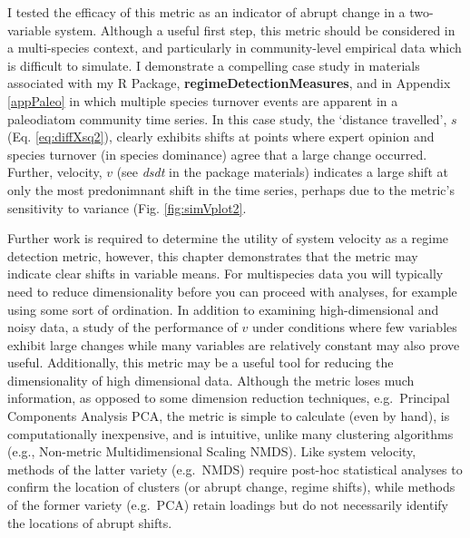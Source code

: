 \documentclass[12pt,twoside,openany]{reedthesis}
\begin{document}
I tested the efficacy of this metric as an indicator of abrupt change in
a two-variable system. Although a useful first step, this metric should
be considered in a multi-species context, and particularly in
community-level empirical data which is difficult to simulate. I
demonstrate a compelling case study in materials associated with my R
Package, \textbf{regimeDetectionMeasures}, and in Appendix
\ref{appPaleo} in which multiple species turnover events are apparent in
a paleodiatom community time series. In this case study, the `distance
travelled', \(s\) (Eq. \eqref{eq:diffXsq2}), clearly exhibits shifts at
points where expert opinion and species turnover (in species dominance)
agree that a large change occurred. Further, velocity, \(v\) (see
\emph{dsdt} in the package materials) indicates a large shift at only
the most predonimnant shift in the time series, perhaps due to the
metric's sensitivity to variance (Fig. \ref{fig:simVplot2}.

Further work is required to determine the utility of system velocity as
a regime detection metric, however, this chapter demonstrates that the
metric may indicate clear shifts in variable means. For multispecies
data you will typically need to reduce dimensionality before you can
proceed with analyses, for example using some sort of ordination. In
addition to examining high-dimensional and noisy data, a study of the
performance of \(v\) under conditions where few variables exhibit large
changes while many variables are relatively constant may also prove
useful. Additionally, this metric may be a useful tool for reducing the
dimensionality of high dimensional data. Although the metric loses much
information, as opposed to some dimension reduction techniques,
e.g.~Principal Components Analysis PCA, the metric is simple to
calculate (even by hand), is computationally inexpensive, and is
intuitive, unlike many clustering algorithms (e.g., Non-metric
Multidimensional Scaling NMDS). Like system velocity, methods of the
latter variety (e.g.~NMDS) require post-hoc statistical analyses to
confirm the location of clusters (or abrupt change, regime shifts),
while methods of the former variety (e.g.~PCA) retain loadings but do
not necessarily identify the locations of abrupt shifts.
\end{document}
